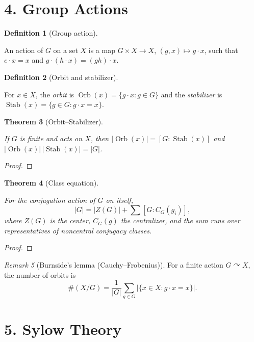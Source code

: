 \documentclass[11pt,letterpaper]{article}
\newtheorem{theorem}{Theorem}
\theoremstyle{definition}
\newtheorem{definition}[theorem]{Definition}
\theoremstyle{remark}
\newtheorem{remark}[theorem]{Remark}
\newcommand{\Stab}{\operatorname{Stab}}
\newcommand{\Orb}{\operatorname{Orb}}
\newcommand{\uses}[1]{}
\begin{document}
\section*{4. Group Actions}

\begin{definition}[Group action]\label{def:action}
\uses{def:group}
An action of $G$ on a set $X$ is a map $G\times X\to X$, $(g,x)\mapsto g\cdot x$, such that $e\cdot x=x$ and $g\cdot(h\cdot x)=(gh)\cdot x$.
\end{definition}

\begin{definition}[Orbit and stabilizer]\label{def:orbit_stabilizer}
\uses{def:group, def:action}
For $x\in X$, the \emph{orbit} is $\Orb(x)=\{g\cdot x:g\in G\}$ and the \emph{stabilizer} is $\Stab(x)=\{g\in G:g\cdot x=x\}$.
\end{definition}

\begin{theorem}[Orbit--Stabilizer]\label{thm:orbit_stabilizer}
\uses{def:action, def:orbit_stabilizer}
If $G$ is finite and acts on $X$, then $|\Orb(x)|=[G:\Stab(x)]$ and $|\Orb(x)|\,|\Stab(x)|=|G|$.
\end{theorem}
\begin{proof}\end{proof}

\begin{theorem}[Class equation]\label{thm:class_eq}
\uses{def:action}
For the conjugation action of $G$ on itself,
\[
|G|=|Z(G)|+\sum [G:C_G(g_i)],
\]
where $Z(G)$ is the center, $C_G(g)$ the centralizer, and the sum runs over representatives of noncentral conjugacy classes.
\end{theorem}
\begin{proof}\uses{thm:orbit_stabilizer}\end{proof}

\begin{remark}[Burnside's lemma (Cauchy--Frobenius)]\label{rem:burnside}
For a finite action $G\curvearrowright X$, the number of orbits is
\[
\#(X/G)=\frac{1}{|G|}\sum_{g\in G}\bigl|\{x\in X: g\cdot x=x\}\bigr|.
\]
\end{remark}

\section*{5. Sylow Theory}
\end{document}
